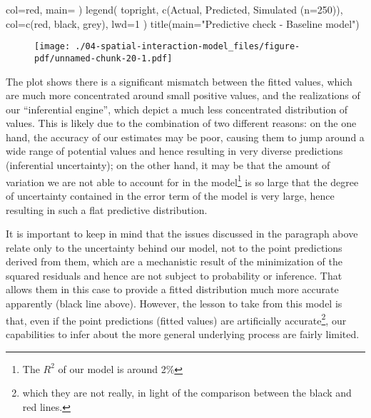 \documentclass[
  letterpaper,
  krantz2]{style/krantz}
\newenvironment{Shaded}{\begin{snugshade}}{\end{snugshade}}
\newcommand{\AttributeTok}[1]{\textcolor[rgb]{0.40,0.45,0.13}{#1}}
\newcommand{\DecValTok}[1]{\textcolor[rgb]{0.68,0.00,0.00}{#1}}
\newcommand{\FunctionTok}[1]{\textcolor[rgb]{0.28,0.35,0.67}{#1}}
\newcommand{\NormalTok}[1]{\textcolor[rgb]{0.00,0.23,0.31}{#1}}
\newcommand{\StringTok}[1]{\textcolor[rgb]{0.13,0.47,0.30}{#1}}
\begin{document}
\begin{Shaded}
\begin{Highlighting}[]
  \AttributeTok{col=}\StringTok{\textquotesingle{}red\textquotesingle{}}\NormalTok{,}
  \AttributeTok{main=}\StringTok{\textquotesingle{}\textquotesingle{}}
\NormalTok{)}
\FunctionTok{legend}\NormalTok{(}
  \StringTok{\textquotesingle{}topright\textquotesingle{}}\NormalTok{, }
  \FunctionTok{c}\NormalTok{(}\StringTok{\textquotesingle{}Actual\textquotesingle{}}\NormalTok{, }\StringTok{\textquotesingle{}Predicted\textquotesingle{}}\NormalTok{, }\StringTok{\textquotesingle{}Simulated (n=250)\textquotesingle{}}\NormalTok{),}
  \AttributeTok{col=}\FunctionTok{c}\NormalTok{(}\StringTok{\textquotesingle{}red\textquotesingle{}}\NormalTok{, }\StringTok{\textquotesingle{}black\textquotesingle{}}\NormalTok{, }\StringTok{\textquotesingle{}grey\textquotesingle{}}\NormalTok{),}
  \AttributeTok{lwd=}\DecValTok{1}
\NormalTok{)}
\FunctionTok{title}\NormalTok{(}\AttributeTok{main=}\StringTok{"Predictive check {-} Baseline model"}\NormalTok{)}
\end{Highlighting}
\end{Shaded}

\begin{figure}[H]

{\centering \texttt{[image: ./04-spatial-interaction-model\_files/figure-pdf/unnamed-chunk-20-1.pdf]}

}

\end{figure}

The plot shows there is a significant mismatch between the fitted
values, which are much more concentrated around small positive values,
and the realizations of our ``inferential engine'', which depict a much
less concentrated distribution of values. This is likely due to the
combination of two different reasons: on the one hand, the accuracy of
our estimates may be poor, causing them to jump around a wide range of
potential values and hence resulting in very diverse predictions
(inferential uncertainty); on the other hand, it may be that the amount
of variation we are not able to account for in the model\footnote{The
  \(R^2\) of our model is around 2\%} is so large that the degree of
uncertainty contained in the error term of the model is very large,
hence resulting in such a flat predictive distribution.

It is important to keep in mind that the issues discussed in the
paragraph above relate only to the uncertainty behind our model, not to
the point predictions derived from them, which are a mechanistic result
of the minimization of the squared residuals and hence are not subject
to probability or inference. That allows them in this case to provide a
fitted distribution much more accurate apparently (black line above).
However, the lesson to take from this model is that, even if the point
predictions (fitted values) are artificially accurate\footnote{which
  they are not really, in light of the comparison between the black and
  red lines.}, our capabilities to infer about the more general
underlying process are fairly limited.
\end{document}
